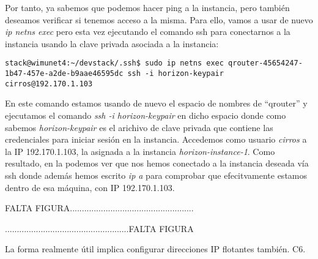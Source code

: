 Por tanto, ya sabemos que podemos hacer ping a la instancia, pero también deseamos verificar si tenemos acceso a la misma. Para ello, vamos a usar de nuevo \textit{ip netns exec} pero esta vez ejecutando el comando ssh para conectarnos a la instancia usando la clave privada asociada a la instancia:

\begin{lstlisting}[style=Consola]
stack@wimunet4:~/devstack/.ssh$ sudo ip netns exec qrouter-45654247-1b47-457e-a2de-b9aae46595dc ssh -i horizon-keypair cirros@192.170.1.103
\end{lstlisting}

En este comando estamos usando de nuevo el espacio de nombres de “qrouter” y ejecutamos el comando \textit{ssh -i horizon-keypair} en dicho espacio donde como sabemos \textit{horizon-keypair} es el arichivo de clave privada que contiene las credenciales para iniciar sesión en la instancia. Accedemos como usuario \textit{cirros} a la IP 192.170.1.103, la asignada a la instancia \textit{horizon-instance-1}. Como resultado, en la %
podemos ver que nos hemos conectado a la instancia deseada vía ssh donde además hemos escrito \textit{ip a} para comprobar que efecitvamente estamos dentro de esa máquina, con IP 192.170.1.103.

\begin{tcolorbox}[colback=green!5!white,colframe=green!75!black]
FALTA FIGURA....................................................

....................................................FALTA FIGURA
\end{tcolorbox}


\begin{comment}
\begin{figure}
    \centering
    \texttt{[image: imagenes/capitulo8/sshInstanceQrouter.PNG]}
    \caption{Acceso vía ssh usando namespaces.}
	\vspace{0.3cm}
    \label{sshInstanceQrouter}
\end{figure}
\end{comment}

\begin{tcolorbox}[colback=red!5!white,colframe=red!75!black]
La forma realmente útil implica configurar direcciones IP flotantes también. C6.
\end{tcolorbox}




















